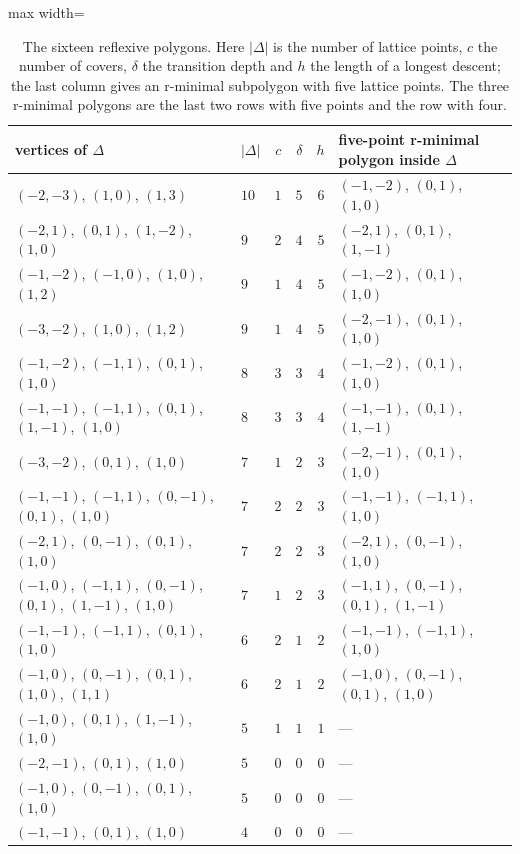 \documentclass[manuscript]{aomart}
\theoremstyle{definition}
\theoremstyle{remark}
\begin{document}
\begin{table}[t]
\caption{The sixteen reflexive polygons. Here $|\Delta|$ is the number of
lattice points, $c$ the number of covers, $\delta$ the transition depth and
$h$ the length of a longest descent; the last column gives an r-minimal
subpolygon with five lattice points. The three r-minimal polygons are the
last two rows with five points and the row with four.}\label{tab:twod}
\centering
\begin{adjustbox}{max width=\linewidth}\begin{tabular}{llrrrl}
\toprule
vertices of $\Delta$ & $|\Delta|$ & $c$ & $\delta$ & $h$ & five-point r-minimal polygon inside $\Delta$\\
\midrule
$(-2,-3)$, $(1,0)$, $(1,3)$ & $10$ & $1$ & $5$ & $6$ & $(-1,-2)$, $(0,1)$, $(1,0)$\\
$(-2,1)$, $(0,1)$, $(1,-2)$, $(1,0)$ & $9$ & $2$ & $4$ & $5$ & $(-2,1)$, $(0,1)$, $(1,-1)$\\
$(-1,-2)$, $(-1,0)$, $(1,0)$, $(1,2)$ & $9$ & $1$ & $4$ & $5$ & $(-1,-2)$, $(0,1)$, $(1,0)$\\
$(-3,-2)$, $(1,0)$, $(1,2)$ & $9$ & $1$ & $4$ & $5$ & $(-2,-1)$, $(0,1)$, $(1,0)$\\
$(-1,-2)$, $(-1,1)$, $(0,1)$, $(1,0)$ & $8$ & $3$ & $3$ & $4$ & $(-1,-2)$, $(0,1)$, $(1,0)$\\
$(-1,-1)$, $(-1,1)$, $(0,1)$, $(1,-1)$, $(1,0)$ & $8$ & $3$ & $3$ & $4$ & $(-1,-1)$, $(0,1)$, $(1,-1)$\\
$(-3,-2)$, $(0,1)$, $(1,0)$ & $7$ & $1$ & $2$ & $3$ & $(-2,-1)$, $(0,1)$, $(1,0)$\\
$(-1,-1)$, $(-1,1)$, $(0,-1)$, $(0,1)$, $(1,0)$ & $7$ & $2$ & $2$ & $3$ & $(-1,-1)$, $(-1,1)$, $(1,0)$\\
$(-2,1)$, $(0,-1)$, $(0,1)$, $(1,0)$ & $7$ & $2$ & $2$ & $3$ & $(-2,1)$, $(0,-1)$, $(1,0)$\\
$(-1,0)$, $(-1,1)$, $(0,-1)$, $(0,1)$, $(1,-1)$, $(1,0)$ & $7$ & $1$ & $2$ & $3$ & $(-1,1)$, $(0,-1)$, $(0,1)$, $(1,-1)$\\
$(-1,-1)$, $(-1,1)$, $(0,1)$, $(1,0)$ & $6$ & $2$ & $1$ & $2$ & $(-1,-1)$, $(-1,1)$, $(1,0)$\\
$(-1,0)$, $(0,-1)$, $(0,1)$, $(1,0)$, $(1,1)$ & $6$ & $2$ & $1$ & $2$ & $(-1,0)$, $(0,-1)$, $(0,1)$, $(1,0)$\\
$(-1,0)$, $(0,1)$, $(1,-1)$, $(1,0)$ & $5$ & $1$ & $1$ & $1$ & ---\\
$(-2,-1)$, $(0,1)$, $(1,0)$ & $5$ & $0$ & $0$ & $0$ & ---\\
$(-1,0)$, $(0,-1)$, $(0,1)$, $(1,0)$ & $5$ & $0$ & $0$ & $0$ & ---\\
$(-1,-1)$, $(0,1)$, $(1,0)$ & $4$ & $0$ & $0$ & $0$ & ---\\
\bottomrule
\end{tabular}\end{adjustbox}
\end{table}
\end{document}
